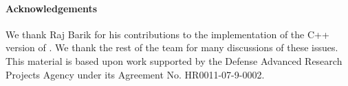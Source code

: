 \paragraph{Acknowledgements} 
We thank Raj Barik for his contributions to the implementation of the
C++ version of \XWS. We thank the rest of the \Xten{} team for many
discussions of these issues. This material is based upon work
supported by the Defense Advanced Research Projects Agency under its
Agreement No.  HR0011-07-9-0002.
